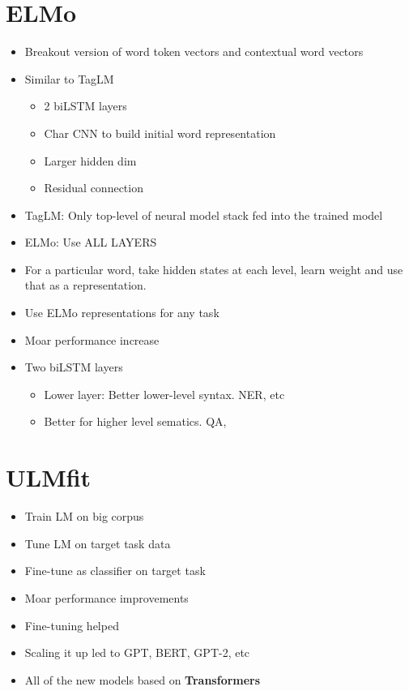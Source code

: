 \documentclass[a4paper]{article}
\begin{document}
\section{ELMo}
\begin{itemize}
    \item Breakout version of word token vectors and contextual word vectors
    \item Similar to TagLM
        \begin{itemize}
            \item 2 biLSTM layers
            \item Char CNN to build initial word representation
            \item Larger hidden dim
            \item Residual connection
        \end{itemize}
    \item TagLM: Only top-level of neural model stack fed into the trained model
    \item ELMo: Use ALL LAYERS
    \item For a particular word, take hidden states at each level, learn weight and use that as a representation.
    \item Use ELMo representations for any task
    \item Moar performance increase
    \item Two biLSTM layers
        \begin{itemize}
            \item Lower layer: Better lower-level syntax. NER, etc
            \item Better for higher level sematics. QA, 
        \end{itemize}
\end{itemize}
\section{ULMfit}
\begin{itemize}
    \item Train LM on big corpus
    \item Tune LM on target task data
    \item Fine-tune as classifier on target task
    \item Moar performance improvements
    \item Fine-tuning helped
    \item Scaling it up led to GPT, BERT, GPT-2, etc
    \item All of the new models based on \textbf{Transformers}  
\end{itemize}
\end{document}
